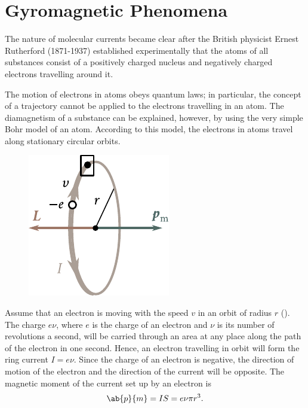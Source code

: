 \section{Gyromagnetic Phenomena}\label{sec:7_6}

The nature of molecular currents became clear after the British physicist Ernest Rutherford (1871-1937) established experimentally that the atoms of all substances consist of a positively charged nucleus and negatively charged electrons travelling around it.

The motion of electrons in atoms obeys quantum laws; in particular, the concept of a trajectory cannot be applied to the electrons travelling in an atom.
The diamagnetism of a substance can be explained, however, by using the very simple Bohr model of an atom.
According to this model, the electrons in atoms travel along stationary circular orbits.

\begin{figure}[!htb]
	\begin{center}
		\includegraphics[scale=1]{figures/ch_07/fig_7_10.pdf}
		\caption[]{}
		\label{fig:7_10}
	\end{center}
	\vspace{-0.8cm}
\end{figure}

Assume that an electron is moving with the speed $v$ in an orbit of radius $r$ ().
The charge $e\nu$, where $e$ is the charge of an electron and $\nu$ is its number of revolutions a second, will be carried through an area at any place along the path of the electron in one second.
Hence, an electron travelling in orbit will form the ring current $I=e\nu$.
Since the charge of an electron is negative, the direction of motion of the electron and the direction of the current will be opposite.
The magnetic moment of the current set up by an electron is
\begin{equation*}
    \ab{p}{m} = IS = e\nu\pi r^3.
\end{equation*}

